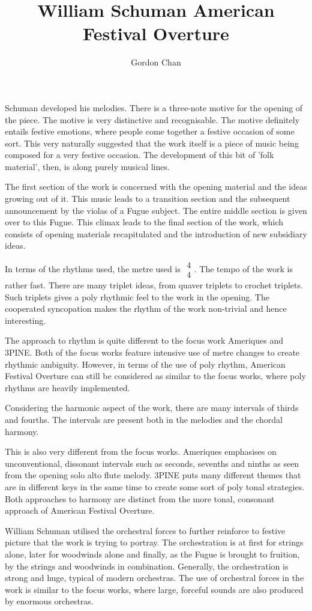 \documentclass[a4paper]{article}
\title{William Schuman American Festival Overture}
\author{Gordon Chan}
\begin{document}
\maketitle

Schuman developed his melodies. There is a three-note motive for the opening of the piece. The motive is very distinctive and recognisable. The motive definitely entails festive emotions, where people come together a festive occasion of some sort. This very naturally suggested that the work itself is a piece of music being composed for a very festive occasion. The development of this bit of 'folk material', then, is along purely musical lines.\par
The first section of the work is concerned with the opening material and the ideas growing out of it. This music leads to a transition section and the subsequent announcement by the violas of a Fugue subject. The entire middle section is given over to this Fugue.  This climax leads to the final section of the work, which consists of opening materials recapitulated and the introduction of new subsidiary ideas.\par
In terms of the rhythms used, the metre used is \(\begin{array}{c}4\\4\end{array}\). The tempo of the work is rather fast. There are many triplet ideas, from quaver triplets to crochet triplets. Such triplets gives a poly rhythmic feel to the work in the opening. The cooperated syncopation makes the rhythm of the work non-trivial and hence interesting.\par
The approach to rhythm is quite different to the focus work Ameriques and 3PINE. Both of the focus works feature intensive use of metre changes to create rhythmic ambiguity. However, in terms of the use of poly rhythm, American Festival Overture can still be considered as similar to the focus works, where poly rhythms are heavily implemented.\par
Considering the harmonic aspect of the work, there are many intervals of thirds and fourths. The intervals are present both in the melodies and the chordal harmony.\par
This is also very different from the focus works. Ameriques emphasises on unconventional, dissonant intervals such as seconds, sevenths and ninths as seen from the opening solo alto flute melody. 3PINE puts many different themes that are in different keys in the same time to create some sort of poly tonal strategies. Both approaches to harmony are distinct from the more tonal, consonant approach of American Festival Overture.\par
William Schuman utilised the orchestral forces to further reinforce to festive picture that the work is trying to portray. The orchestration is at first for strings alone, later for woodwinds alone and finally, as the Fugue is brought to fruition, by the strings and woodwinds in combination. Generally, the orchestration is strong and huge, typical of modern orchestras. The use of orchestral forces in the work is similar to the focus works, where large, forceful sounds are also produced by enormous orchestras.
\end{document}
